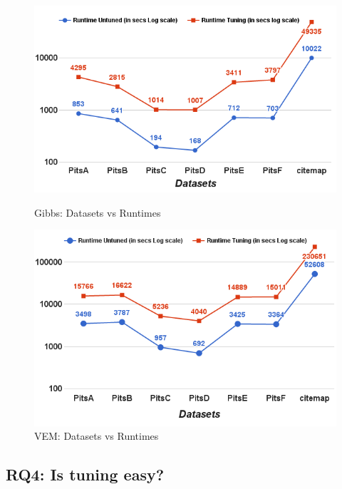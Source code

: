 \documentclass[conference]{IEEEtran}
\theoremstyle{break}
\begin{document}
\begin{figure}[!t]
    \centering
    \begin{minipage}{.5\textwidth}
        \captionsetup{justification=centering,singlelinecheck=off}
        \includegraphics[width=\linewidth]{./fig/Run_gibbs_sci.png}
  \caption{Gibbs: Datasets vs Runtimes}
  \label{RQ5 Gibbs}
    \end{minipage}%
    \begin{minipage}{.5\textwidth}
        \captionsetup{labelsep=space,justification=centering,singlelinecheck=off}
        \includegraphics[width=\linewidth]{./fig/Run_VEM_sci.png}
  \caption{VEM: Datasets vs Runtimes}
  \label{RQ5 VEM}
    \end{minipage}
\end{figure}

\subsection{\textbf{RQ4: Is  tuning  easy?}}
\end{document}
